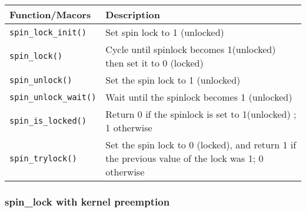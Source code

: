 \documentclass{article}
\begin{document}
  \begin{center}
  \begin{tabular}{ |l | p{7cm}| }    
    \hline
    Function/Macors & Description \\ \hline
    \lstinline{spin_lock_init()} & Set spin lock to 1 (unlocked) \\
    \hline
    \lstinline{spin_lock()} &
    Cycle until spinlock becomes 1(unlocked) then set it to 0 (locked) \\
    \hline
    \lstinline{spin_unlock()} & Set the spin lock to 1 (unlocked) \\
    \hline
    \lstinline{spin_unlock_wait()} & Wait until the spinlock becomes 1 (unlocked)  \\
    \hline
    \lstinline{spin_is_locked()} & Return 0 if the spinlock is set to 1(unlocked) ; 1 otherwise  \\
    \hline
    \lstinline{spin_trylock()} &  Set the spin lock to 0 (locked), and return 1 if the previous value of the lock was 1; 0 otherwise\\
    \hline
  \end{tabular}
  \end{center}

  \subsubsection{spin\_lock with kernel preemption}
\end{document}
